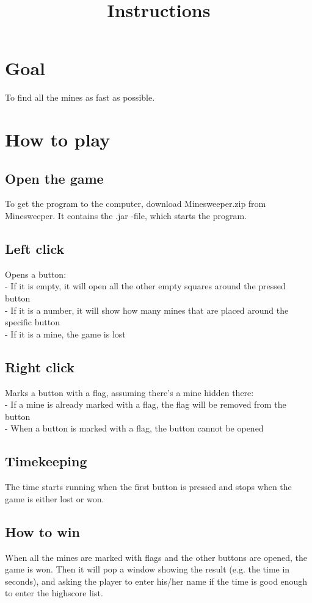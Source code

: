 \documentclass[12pt,twoside,a4paper]{article}
\title{Instructions}
\begin{document}
\maketitle

\section{Goal}

To find all the mines as fast as possible.

\section{How to play}

\subsection{Open the game}

To get the program to the computer, download Minesweeper.zip from Minesweeper. It contains the .jar -file, which starts the program.

\subsection{Left click}

Opens a button: \\
- If it is empty, it will open all the other empty squares around the pressed button \\
- If it is a number, it will show how many mines that are placed around the specific button \\
- If it is a mine, the game is lost \\

\subsection{Right click} 

Marks a button with a flag, assuming there's a mine hidden there: \\
- If a mine is already marked with a flag, the flag will be removed from the button \\
- When a button is marked with a flag, the button cannot be opened \\

\subsection{Timekeeping}

The time starts running when the first button is pressed and stops when the game is either lost or won.

\subsection{How to win}

When all the mines are marked with flags and the other buttons are opened, the game is won. Then it will pop a 
window showing the result (e.g. the time in seconds), and asking the player to enter his/her name if the time is good 
enough to enter the highscore list.
\end{document}
